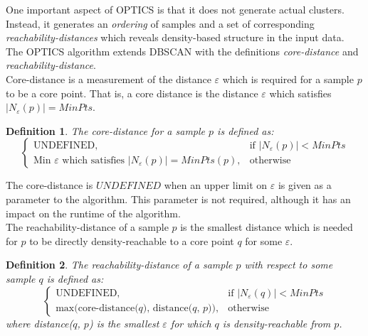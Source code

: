 \documentclass[a4paper]{report}
\newtheorem*{definition}{Definition}
\begin{document}
One important aspect of OPTICS is that it does not generate actual clusters.
Instead, it generates an \emph{ordering} of samples and a set of corresponding
\emph{reachability-distances} which reveals density-based structure in the
input data. The OPTICS algorithm extends DBSCAN with the definitions
\emph{core-distance} and \emph{reachability-distance}.
\\
Core-distance is a measurement of the distance $\varepsilon$ which is required
for a sample $p$ to be a core point. That is, a core distance is the distance
$\varepsilon$ which satisfies $|N_{\varepsilon}(p)| = MinPts$.

\begin{definition}
    The core-distance for a sample $p$ is defined as:
\[
    \begin{cases}
        \text{UNDEFINED}, & \text{if $|N_{\varepsilon}(p)| < MinPts$}\\
        \text{Min $\varepsilon$ which satisfies  $|N_{\varepsilon}(p)| =
        MinPts$}(p), & \text{otherwise}
    \end{cases}
\]
\end{definition}

The core-distance is $UNDEFINED$ when an upper limit on $\varepsilon$ is
given as a parameter to the algorithm. This parameter is not required,
although it has an impact on the runtime of the algorithm.
\\
The reachability-distance of a sample $p$ is the smallest distance which is
needed for $p$ to be directly density-reachable to a core point $q$ for some
$\varepsilon$.

\begin{definition}
    The reachability-distance of a sample $p$ with respect to some sample $q$
    is defined as:
\[
    \begin{cases}
        \text{UNDEFINED}, & \text{if $|N_{\varepsilon}(q)| < MinPts$}\\
        \text{max(core-distance($q$), distance($q$, $p$))}, & \text{otherwise}
    \end{cases}
\]
    where distance($q$, $p$) is the smallest $\varepsilon$ for which $q$ is
    density-reachable from $p$.
\end{definition}
\end{document}
